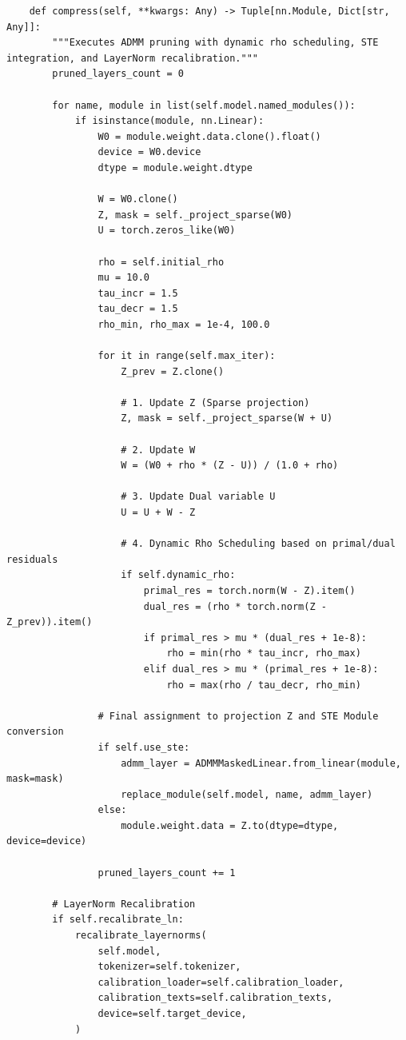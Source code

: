 \begin{lstlisting}
    def compress(self, **kwargs: Any) -> Tuple[nn.Module, Dict[str, Any]]:
        """Executes ADMM pruning with dynamic rho scheduling, STE integration, and LayerNorm recalibration."""
        pruned_layers_count = 0

        for name, module in list(self.model.named_modules()):
            if isinstance(module, nn.Linear):
                W0 = module.weight.data.clone().float()
                device = W0.device
                dtype = module.weight.dtype

                W = W0.clone()
                Z, mask = self._project_sparse(W0)
                U = torch.zeros_like(W0)

                rho = self.initial_rho
                mu = 10.0
                tau_incr = 1.5
                tau_decr = 1.5
                rho_min, rho_max = 1e-4, 100.0

                for it in range(self.max_iter):
                    Z_prev = Z.clone()

                    # 1. Update Z (Sparse projection)
                    Z, mask = self._project_sparse(W + U)

                    # 2. Update W
                    W = (W0 + rho * (Z - U)) / (1.0 + rho)

                    # 3. Update Dual variable U
                    U = U + W - Z

                    # 4. Dynamic Rho Scheduling based on primal/dual residuals
                    if self.dynamic_rho:
                        primal_res = torch.norm(W - Z).item()
                        dual_res = (rho * torch.norm(Z - Z_prev)).item()
                        if primal_res > mu * (dual_res + 1e-8):
                            rho = min(rho * tau_incr, rho_max)
                        elif dual_res > mu * (primal_res + 1e-8):
                            rho = max(rho / tau_decr, rho_min)

                # Final assignment to projection Z and STE Module conversion
                if self.use_ste:
                    admm_layer = ADMMMaskedLinear.from_linear(module, mask=mask)
                    replace_module(self.model, name, admm_layer)
                else:
                    module.weight.data = Z.to(dtype=dtype, device=device)

                pruned_layers_count += 1

        # LayerNorm Recalibration
        if self.recalibrate_ln:
            recalibrate_layernorms(
                self.model,
                tokenizer=self.tokenizer,
                calibration_loader=self.calibration_loader,
                calibration_texts=self.calibration_texts,
                device=self.target_device,
            )


\end{lstlisting}
